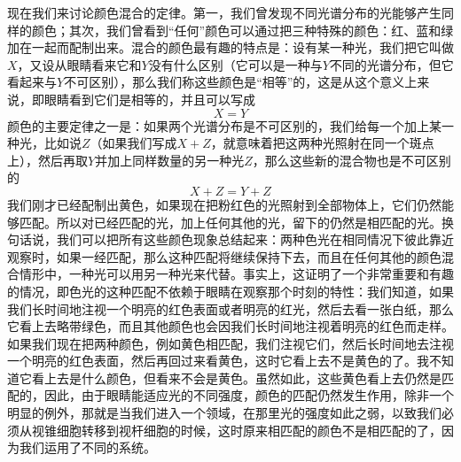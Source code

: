 现在我们来讨论颜色混合的定律。第一，我们曾发现不同光谱分布的光能够产生同样的颜色；其次，我们曾看到“任何”颜色可以通过把三种特殊的颜色：红、蓝和绿加在一起而配制出来。混合的颜色最有趣的特点是：设有某一种光，我们把它叫做$X$，又设从眼睛看来它和$Y$没有什么区别（它可以是一种与$Y$不同的光谱分布，但它看起来与$Y$不可区别），那么我们称这些颜色是“相等”的，这是从这个意义上来说，即眼睛看到它们是相等的，并且可以写成
\begin{equation}
    \label{Eq:I:35:2}
    X = Y
\end{equation}
颜色的主要定律之一是：如果两个光谱分布是不可区别的，我们给每一个加上某一种光，比如说$Z$（如果我们写成$X+Z$，就意味着把这两种光照射在同一个斑点上），然后再取$Y$并加上同样数量的另一种光$Z$，那么这些新的混合物也是不可区别的
\begin{equation}
    \label{Eq:I:35:3}
    X + Z = Y + Z
\end{equation}
我们刚才已经配制出黄色，如果现在把粉红色的光照射到全部物体上，它们仍然能够匹配。所以对已经匹配的光，加上任何其他的光，留下的仍然是相匹配的光。换句话说，我们可以把所有这些颜色现象总结起来：两种色光在相同情况下彼此靠近观察时，如果一经匹配，那么这种匹配将继续保持下去，而且在任何其他的颜色混合情形中，一种光可以用另一种光来代替。事实上，这证明了一个非常重要和有趣的情况，即色光的这种匹配不依赖于眼睛在观察那个时刻的特性：我们知道，如果我们长时间地注视一个明亮的红色表面或者明亮的红光，然后去看一张白纸，那么它看上去略带绿色，而且其他颜色也会因我们长时间地注视着明亮的红色而走样。如果我们现在把两种颜色，例如黄色相匹配，我们注视它们，然后长时间地去注视一个明亮的红色表面，然后再回过来看黄色，这时它看上去不是黄色的了。我不知道它看上去是什么颜色，但看来不会是黄色。虽然如此，这些黄色看上去仍然是匹配的，因此，由于眼睛能适应光的不同强度，颜色的匹配仍然发生作用，除非一个明显的例外，那就是当我们进入一个领域，在那里光的强度如此之弱，以致我们必须从视锥细胞转移到视杆细胞的时候，这时原来相匹配的颜色不是相匹配的了，因为我们运用了不同的系统。

